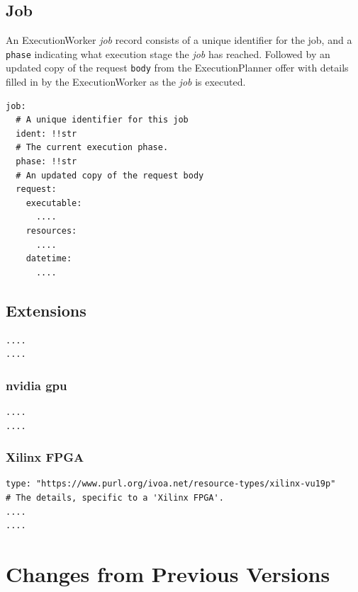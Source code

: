 \documentclass[11pt,a4paper]{ivoa}
\newcommand{\execplanner} {ExecutionPlanner}
\newcommand{\execworker} {ExecutionWorker}
\newcommand{\codeword}[1] {\texttt{#1}}
\newcommand{\workerjob} {\textit{job}}
\begin{document}
\subsection{Job}
\label{datamodel-job}

An \execworker{} \workerjob{} record consists of a unique identifier for the job,
and a \codeword{phase} indicating what execution stage the \workerjob{} has reached.
Followed by an updated copy of the request \codeword{body} from the \execplanner{}
offer with details filled in by the \execworker{} as the \workerjob{} is executed.

\begin{lstlisting}[]
job:
  # A unique identifier for this job
  ident: !!str
  # The current execution phase.
  phase: !!str
  # An updated copy of the request body
  request:
    executable:
      ....
    resources:
      ....
    datetime:
      ....
\end{lstlisting}

\subsection{Extensions}
\label{datamodel-extensions}

\begin{lstlisting}[]
....
....
\end{lstlisting}

\subsubsection{nvidia gpu}
\label{datamodel-nvidia-gpu}

\begin{lstlisting}[]
....
....
\end{lstlisting}

\subsubsection{Xilinx FPGA}
\label{datamodel-xilinx-fpga}

\begin{lstlisting}[]
type: "https://www.purl.org/ivoa.net/resource-types/xilinx-vu19p"
# The details, specific to a 'Xilinx FPGA'.
....
....
\end{lstlisting}


\pagebreak
\appendix
\section{Changes from Previous Versions}
\end{document}

